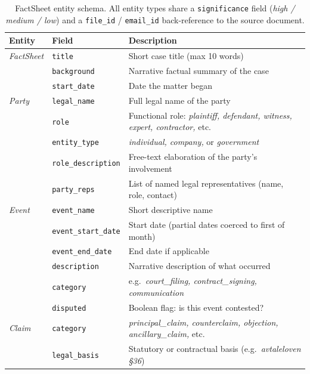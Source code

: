 \begin{table}[H]
\centering
\caption{FactSheet entity schema. All entity types share a \texttt{significance} field (\textit{high / medium / low}) and a \texttt{file\_id} / \texttt{email\_id} back-reference to the source document.}
\label{tab:factsheet-schema}
\small
\begin{tabular}{llp{6.5cm}}
\toprule
\textbf{Entity} & \textbf{Field} & \textbf{Description} \\
\midrule
\textit{FactSheet} & \texttt{title}      & Short case title (max 10 words) \\
                   & \texttt{background} & Narrative factual summary of the case \\
                   & \texttt{start\_date} & Date the matter began \\
\midrule
\textit{Party}     & \texttt{legal\_name}       & Full legal name of the party \\
                   & \texttt{role}              & Functional role: \textit{plaintiff, defendant, witness, expert, contractor,} etc. \\
                   & \texttt{entity\_type}       & \textit{individual, company,} or \textit{government} \\
                   & \texttt{role\_description}  & Free-text elaboration of the party's involvement \\
                   & \texttt{party\_reps}        & List of named legal representatives (name, role, contact) \\
\midrule
\textit{Event}     & \texttt{event\_name}        & Short descriptive name \\
                   & \texttt{event\_start\_date} & Start date (partial dates coerced to first of month) \\
                   & \texttt{event\_end\_date}   & End date if applicable \\
                   & \texttt{description}        & Narrative description of what occurred \\
                   & \texttt{category}           & e.g.\ \textit{court\_filing, contract\_signing, communication} \\
                   & \texttt{disputed}           & Boolean flag: is this event contested? \\
\midrule
\textit{Claim}     & \texttt{category}           & \textit{principal\_claim, counterclaim, objection, ancillary\_claim,} etc. \\
                   & \texttt{legal\_basis}        & Statutory or contractual basis (e.g.\ \textit{avtaleloven \S 36}) \\

\end{tabular}
\end{table}
